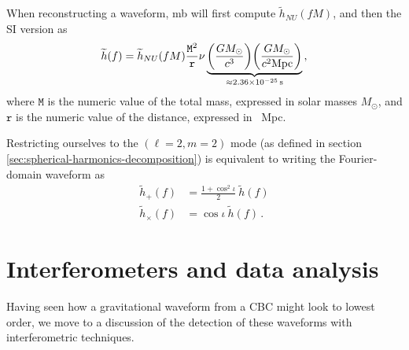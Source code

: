 \documentclass[main.tex]{subfiles}
\begin{document}
When reconstructing a waveform, \ac{mb} will first compute \(\widetilde{h}_{NU} (fM)\), and then the \ac{SI} version as 
%
\begin{align}
\widetilde{h}(f) 
= \widetilde{h}_{NU} (fM) \frac{\mathtt{M}^2}{\mathtt{r}} \nu 
\underbrace{\qty(\frac{G M_{\odot}}{c^3}) 
\qty(\frac{G M_{\odot}}{ c^2 \SI{}{Mpc} })}_{\approx \SI{2.36e-25}{s}}
\,,
\end{align}
%
where \(\mathtt{M}\) is the numeric value of the total mass, expressed in solar masses \(M_{\odot}\), and \(\mathtt{r}\) is the numeric value of the distance, expressed in \SI{}{Mpc}. 

Restricting ourselves to the \((\ell=2, m=2)\) mode (as defined in section \ref{sec:spherical-harmonics-decomposition}) is equivalent to writing the Fourier-domain waveform as 
%
\begin{align}
\widetilde{h}_{+}(f) &= \frac{1 + \cos^2 \iota }{2} \ \widetilde{h} (f)  \\
\widetilde{h}_{ \times } (f) &= \cos \iota \ \widetilde{h}(f)
\,.
\end{align}

\section{Interferometers and data analysis} \label{sec:data-analysis}

Having seen how a gravitational waveform from a \ac{CBC} might look to lowest order, we move to a discussion of the detection of these waveforms with interferometric techniques. 
\end{document}
